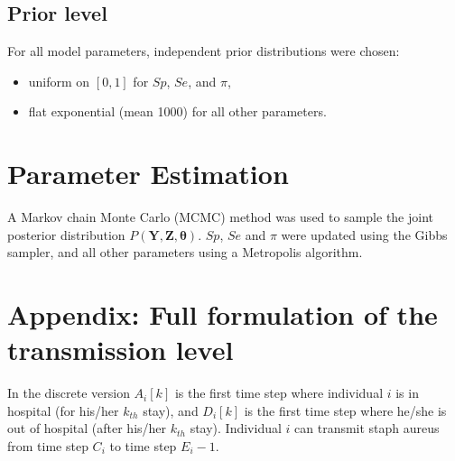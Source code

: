 \documentclass[10pt]{article}
\begin{document}





\subsection*{Prior level}


For all model parameters, independent prior distributions were chosen: 
\begin{itemize}
	\item uniform on $[0,1]$ for $Sp$, $Se$, and $\pi$, 
	\item flat exponential (mean 1000) for all other parameters. 
\end{itemize}

  
\section*{Parameter Estimation}

A Markov chain Monte Carlo (MCMC) method was used to sample the joint
posterior distribution $P\left(\bm{Y},\bm{Z},\bm{\theta}\right)$.
$Sp$, $Se$ and $\pi$ were updated using the Gibbs sampler, and all other parameters using a Metropolis algorithm.


\section*{Appendix: Full formulation of the transmission level}

In the discrete version $A_i[k]$ is the first time step where individual $i$ is in hospital (for his/her $k_{th}$ stay), and $D_i[k]$ is the first time step where he/she is out of hospital (after his/her $k_{th}$ stay). Individual $i$ can transmit staph aureus from time step $C_i$ to time step $E_i-1$. 
\end{document}
